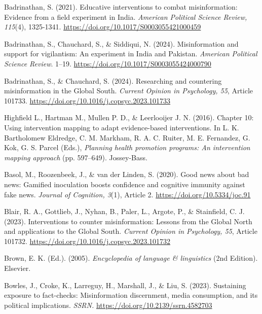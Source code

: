 \documentclass[authordate, reflection]{jote-new-article}
\begin{document}
	Badrinathan, S. (2021). Educative interventions to combat misinformation: Evidence from a field experiment in India. \emph{American Political Science Review, 115}(4), 1325-1341. \url{https://doi.org/10.1017/S0003055421000459}



	Badrinathan, S., Chauchard, S., \& Siddiqui, N. (2024). Misinformation and support for vigilantism: An experiment in India and Pakistan. \emph{American Political Science Review}. 1--19. \url{https://doi.org/10.1017/S0003055424000790}



	Badrinathan, S., \& Chauchard, S. (2024). Researching and countering misinformation in the Global South. \emph{Current Opinion in Psychology, 55}, Article 101733. \url{https://doi.org/10.1016/j.copsyc.2023.101733}



	Highfield L., Hartman M., Mullen P. D., \& Leerlooijer J. N. (2016). Chapter 10: Using intervention mapping to adapt evidence-based interventions. In L. K. Bartholomew Eldredge, C. M. Markham, R. A. C. Ruiter, M. E. Fernandez, G. Kok, G. S. Parcel (Eds.), \emph{Planning health promotion programs: An intervention mapping approach} (pp. 597--649). Jossey-Bass.



	Basol, M., Roozenbeek, J., \& van der Linden, S. (2020). Good news about bad news: Gamified inoculation boosts confidence and cognitive immunity against fake news. \emph{Journal of Cognition, 3}(1), Article 2. \url{https://doi.org/10.5334/joc.91}



	Blair, R. A., Gottlieb, J., Nyhan, B., Paler, L., Argote, P., \& Stainfield, C. J. (2023). Interventions to counter misinformation: Lessons from the Global North and applications to the Global South. \emph{Current Opinion in Psychology, 55}, Article 101732. \url{https://doi.org/10.1016/j.copsyc.2023.101732}



	Brown, E. K. (Ed.). (2005). \emph{Encyclopedia of language \& linguistics} (2nd Edition). Elsevier.



	Bowles, J., Croke, K., Larreguy, H., Marshall, J., \& Liu, S. (2023). Sustaining exposure to fact-checks: Misinformation discernment, media consumption, and its political implications. \emph{SSRN.} \url{https://doi.org/10.2139/ssrn.4582703}
\end{document}
